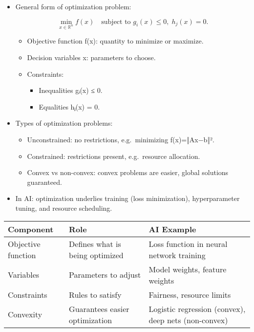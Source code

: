 \documentclass[
  letterpaper,
  DIV=11,
  numbers=noendperiod]{scrreprt}
\providecommand{\tightlist}{%
  \setlength{\itemsep}{0pt}\setlength{\parskip}{0pt}}
\begin{document}
\begin{itemize}
\item
  General form of optimization problem:

  \[
  \min_{x \in \mathbb{R}^n} f(x) \quad \text{subject to } g_i(x) \leq 0, \; h_j(x)=0.
  \]

  \begin{itemize}
  \item
    Objective function f(x): quantity to minimize or maximize.
  \item
    Decision variables x: parameters to choose.
  \item
    Constraints:

    \begin{itemize}
    \tightlist
    \item
      Inequalities gᵢ(x) ≤ 0.
    \item
      Equalities hⱼ(x) = 0.
    \end{itemize}
  \end{itemize}
\item
  Types of optimization problems:

  \begin{itemize}
  \tightlist
  \item
    Unconstrained: no restrictions, e.g.~minimizing f(x)=‖Ax−b‖².
  \item
    Constrained: restrictions present, e.g.~resource allocation.
  \item
    Convex vs non-convex: convex problems are easier, global solutions
    guaranteed.
  \end{itemize}
\item
  In AI: optimization underlies training (loss minimization),
  hyperparameter tuning, and resource scheduling.
\end{itemize}

\begin{longtable}[]{@{}
  >{\raggedright\arraybackslash}p{}
  >{\raggedright\arraybackslash}p{}
  >{\raggedright\arraybackslash}p{}@{}}
\toprule\noalign{}
\begin{minipage}[b]{\linewidth}\raggedright
Component
\end{minipage} & \begin{minipage}[b]{\linewidth}\raggedright
Role
\end{minipage} & \begin{minipage}[b]{\linewidth}\raggedright
AI Example
\end{minipage} \\
\midrule\noalign{}
\endhead
\bottomrule\noalign{}
\endlastfoot
Objective function & Defines what is being optimized & Loss function in
neural network training \\
Variables & Parameters to adjust & Model weights, feature weights \\
Constraints & Rules to satisfy & Fairness, resource limits \\
Convexity & Guarantees easier optimization & Logistic regression
(convex), deep nets (non-convex) \\
\end{longtable}
\end{document}
